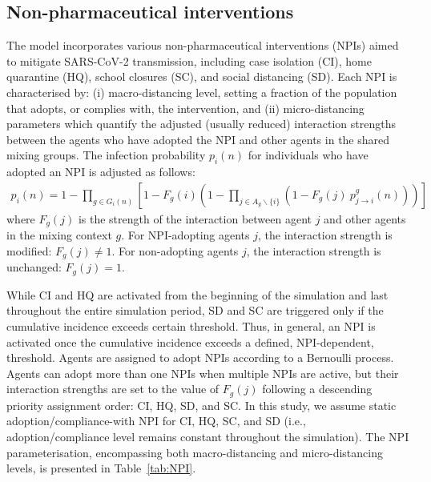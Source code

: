 \documentclass{article}
\begin{document}
\begin{appendices}
\subsection{Non-pharmaceutical interventions}
The model incorporates various non-pharmaceutical interventions (NPIs) aimed to mitigate SARS-CoV-2 transmission, including case isolation (CI), home quarantine (HQ), school closures (SC), and social distancing (SD). Each NPI is characterised by: (i) macro-distancing level, setting a fraction of the population that adopts, or complies with, the intervention, and (ii) micro-distancing parameters which quantify the adjusted (usually reduced) interaction strengths between the agents who have adopted the NPI and other agents in the shared mixing groups. The infection probability $p_i(n)$ for individuals who have adopted an NPI is adjusted as follows:
\begin{eqnarray}
    p_i(n) =  1 - \prod_{g \in G_i(n)} \left [1 - F_g(i) \left ( 1 - \prod_{j \in A_g\backslash\{i\}} (1 - F_g(j) \ p^g_{j \rightarrow i}(n)) \right ) \right ]
    \label{eq:infection_prob_compliant_agent}
\end{eqnarray}
where $F_g(j)$ is the strength of the interaction between agent $j$ and other agents in the mixing context $g$. For NPI-adopting agents $j$, the interaction strength is modified: $F_g(j) \neq 1$. For non-adopting agents $j$, the interaction strength is unchanged: $F_g(j) = 1$. 

While CI and HQ are activated from the beginning of the simulation and last throughout the entire simulation period, SD and SC are triggered only if the cumulative incidence exceeds certain threshold. Thus, in general, an NPI is activated once the cumulative incidence exceeds a defined, NPI-dependent, threshold. Agents are assigned to adopt NPIs according to a Bernoulli process. Agents can adopt more than one NPIs when multiple NPIs are active, but their interaction strengths are set to the value of $F_g(j)$ following a descending priority assignment order: CI, HQ, SD, and SC. In this study, we assume static adoption/compliance-with NPI for CI, HQ, SC, and SD (i.e., adoption/compliance level remains constant throughout the simulation). The NPI parameterisation, encompassing both macro-distancing and micro-distancing levels, is presented in Table~\ref{tab:NPI}.


\end{appendices}
\end{document}
